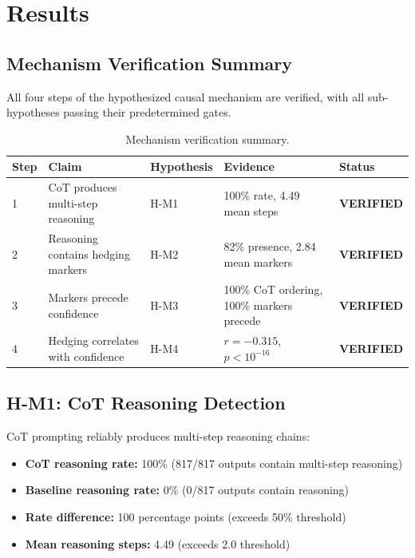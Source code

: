 \section{Results}

\subsection{Mechanism Verification Summary}

All four steps of the hypothesized causal mechanism are verified, with all sub-hypotheses passing their predetermined gates.

\begin{table}[h]
\centering
\begin{tabular}{lllll}
\toprule
Step & Claim & Hypothesis & Evidence & Status \\
\midrule
1 & CoT produces multi-step reasoning & H-M1 & 100\% rate, 4.49 mean steps & \textbf{VERIFIED} \\
2 & Reasoning contains hedging markers & H-M2 & 82\% presence, 2.84 mean markers & \textbf{VERIFIED} \\
3 & Markers precede confidence & H-M3 & 100\% CoT ordering, 100\% markers precede & \textbf{VERIFIED} \\
4 & Hedging correlates with confidence & H-M4 & $r=-0.315$, $p<10^{-16}$ & \textbf{VERIFIED} \\
\bottomrule
\end{tabular}
\caption{Mechanism verification summary.}
\label{tab:mechanism_verification}
\end{table}

\subsection{H-M1: CoT Reasoning Detection}

CoT prompting reliably produces multi-step reasoning chains:

\begin{itemize}
    \item \textbf{CoT reasoning rate:} 100\% (817/817 outputs contain multi-step reasoning)
    \item \textbf{Baseline reasoning rate:} 0\% (0/817 outputs contain reasoning)
    \item \textbf{Rate difference:} 100 percentage points (exceeds 50\% threshold)
    \item \textbf{Mean reasoning steps:} 4.49 (exceeds 2.0 threshold)
\end{itemize}

